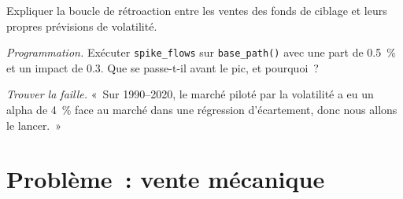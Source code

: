 \begin{exercise}[$\star\star$]\label{exo:s1:volatility-targeting-and-risk-managed-portfolios:6}
Expliquer la boucle de rétroaction entre les ventes des fonds de ciblage et leurs propres prévisions de volatilité.
\end{exercise}

\begin{exercise}[$\star\star\star$]\label{exo:s1:volatility-targeting-and-risk-managed-portfolios:7}
\emph{Programmation.} Exécuter \texttt{spike\_flows} sur \texttt{base\_path()} avec une part de 0.5~\% et un impact de 0.3. Que se passe-t-il avant le pic, et pourquoi~?
\end{exercise}

\begin{exercise}[$\star\star\star$]\label{exo:s1:volatility-targeting-and-risk-managed-portfolios:8}
\emph{Trouver la faille.} «~Sur 1990--2020, le marché piloté par la volatilité a eu un alpha de 4~\% face au marché dans une régression d'écartement, donc nous allons le lancer.~»
\end{exercise}

\section{Problème~: vente mécanique}

